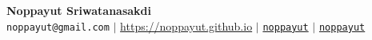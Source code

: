 \documentclass[letterpaper,10pt]{article}
\begin{document}
\begin{center}
    \textbf{\Huge Noppayut Sriwatanasakdi} \\ \vspace{5pt}
    \hspace{1pt} \faEnvelope \hspace{2pt} \texttt{noppayut@gmail.com} \hspace{1pt} $|$ 
    \hspace{1pt} \faGlobe \hspace{2pt} \url{https://noppayut.github.io} \hspace{1pt} $|$
    \hspace{1pt} \faGithub \hspace{2pt}\href{https://github.com/noppayut}{\texttt{noppayut}}\hspace{1pt} $|$
    \hspace{1pt} \faLinkedin \hspace{2pt}\href{https://www.linkedin.com/in/noppayut/}{\texttt{noppayut}}
    \\ \vspace{-3pt}
\end{center}









% 






\end{document}

